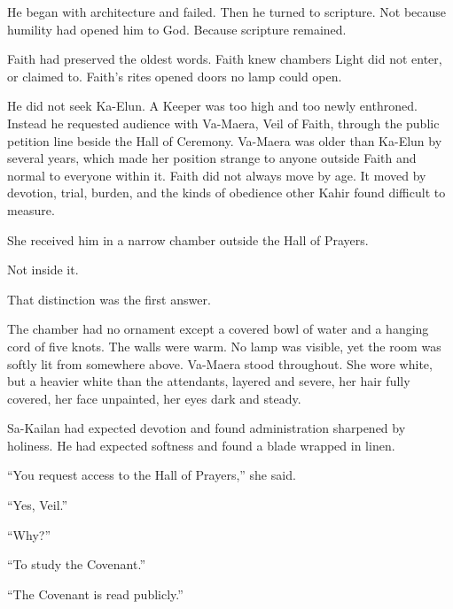 He began with architecture and failed. Then he turned to scripture. Not because humility had opened him to God. Because scripture remained.\par

Faith had preserved the oldest words. Faith knew chambers Light did not enter, or claimed to. Faith’s rites opened doors no lamp could open.\par

He did not seek Ka-Elun. A Keeper was too high and too newly enthroned. Instead he requested audience with Va-Maera, Veil of Faith, through the public petition line beside the Hall of Ceremony. Va-Maera was older than Ka-Elun by several years, which made her position strange to anyone outside Faith and normal to everyone within it. Faith did not always move by age. It moved by devotion, trial, burden, and the kinds of obedience other Kahir found difficult to measure.\par

She received him in a narrow chamber outside the Hall of Prayers.\par

Not inside it.\par

That distinction was the first answer.\par

The chamber had no ornament except a covered bowl of water and a hanging cord of five knots. The walls were warm. No lamp was visible, yet the room was softly lit from somewhere above. Va-Maera stood throughout. She wore white, but a heavier white than the attendants, layered and severe, her hair fully covered, her face unpainted, her eyes dark and steady.\par

Sa-Kailan had expected devotion and found administration sharpened by holiness. He had expected softness and found a blade wrapped in linen.\par

“You request access to the Hall of Prayers,” she said.\par

“Yes, Veil.”\par

“Why?”\par

“To study the Covenant.”\par

“The Covenant is read publicly.”\par

